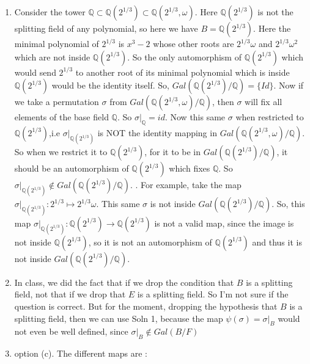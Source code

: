 \documentclass[12pt]{article}
\begin{document}
\begin{enumerate}
    \item[\bf{Soln 1: }]  Consider the tower $\mathbb{Q}\subset\mathbb{Q}(2^{1/3})\subset\mathbb{Q}(2^{1/3}, \omega)$. Here $\mathbb{Q}(2^{1/3})$ is not the splitting field of any polynomial, so here we have $B=\mathbb{Q}(2^{1/3})$. Here the minimal polynomial of $2^{1/3}$ is $x^3-2$ whose other roots are $2^{1/3}\omega$ and $2^{1/3}\omega^2$ which are not inside $\mathbb{Q}(2^{1/3})$. So the only automorphism of $\mathbb{Q}(2^{1/3})$ which would send $2^{1/3}$ to another root of its minimal polynomial which is inside $\mathbb{Q}(2^{1/3})$ would be the identity itself. So, $Gal (\mathbb{Q}(2^{1/3})/\mathbb{Q})=\{Id\}$. Now if we take a permutation $\sigma$ from $Gal(\mathbb{Q}(2^{1/3},\omega)/\mathbb{Q})$, then $\sigma$ will fix all elements of the base field $\mathbb{Q}$. So $\sigma\vert_\mathbb{Q}=id$. Now this same $\sigma$ when restricted to $\mathbb{Q}(2^{1/3})$,i.e $\sigma|_{\mathbb{Q}(2^{1/3})}$ is NOT the identity mapping in $Gal(\mathbb{Q}(2^{1/3},\omega)/\mathbb{Q})$. So when we restrict it to $\mathbb{Q}(2^{1/3})$, for it to be in $Gal(\mathbb{Q}(2^{1/3})/\mathbb{Q})$, it should be an automorphism of $\mathbb{Q}(2^{1/3})$ which fixes $\mathbb{Q}$. So $\sigma\vert_{\mathbb{Q}(2^{1/3})}\notin Gal(\mathbb{Q}(2^{1/3})/\mathbb{Q})$. . For example, take the map $\sigma\vert_{\mathbb{Q}(2^{1/3})}: 2^{1/3} \longmapsto2^{1/3}\omega$. This same $\sigma$ is not inside $Gal(\mathbb{Q}(2^{1/3})/\mathbb{Q})$. So, this map $\sigma\vert_{\mathbb{Q}(2^{1/3})}:\mathbb{Q}(2^{1/3}) \longrightarrow \mathbb{Q}(2^{1/3})$ is not a valid map, since the image is not inside $\mathbb{Q}(2^{1/3})$, so it is not an automorphism of $\mathbb{Q}(2^{1/3})$ and thus it is not inside $Gal(\mathbb{Q}(2^{1/3})/\mathbb{Q})$.

    \item[\bf{Soln 2: }] In class, we did the fact that if we drop the condition that $B$ is a splitting field, not that if we drop that $E$ is a splitting field. So I'm not sure if the question is correct. But for the moment, dropping the hypothesis that $B$ is a splitting field, then we can use Soln 1, because the map $\psi(\sigma)=\sigma\vert_B$ would not even be well defined, since $\sigma\vert_B\notin Gal(B/F)$
    \item[\bf{Soln 3: }] option (c). The different maps are :


\end{enumerate}
\end{document}
